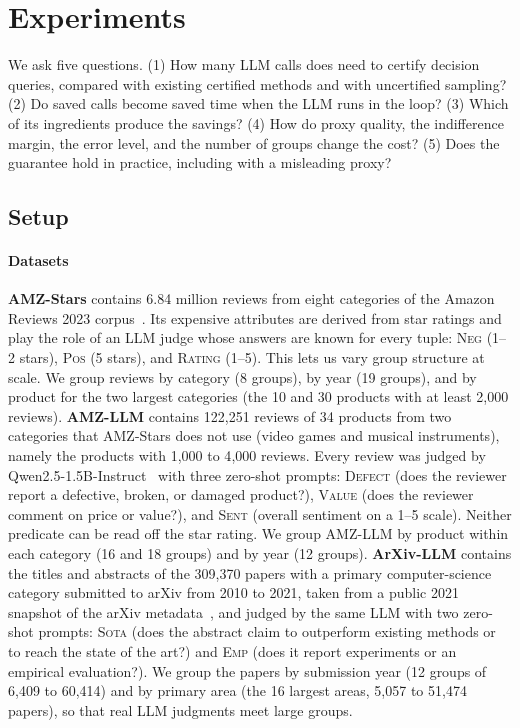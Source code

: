 \section{Experiments}
\label{sec:exp}

We ask five questions.
(1) How many LLM calls does \sys{} need to certify decision queries, compared with existing certified methods and with uncertified sampling?
(2) Do saved calls become saved time when the LLM runs in the loop?
(3) Which of its ingredients produce the savings?
(4) How do proxy quality, the indifference margin, the error level, and the number of groups change the cost?
(5) Does the guarantee hold in practice, including with a misleading proxy?

\subsection{Setup}
\label{sec:setup}

\paragraph*{Datasets}
\textbf{AMZ-Stars} contains 6.84 million reviews from eight categories of the Amazon Reviews 2023 corpus~\cite{amazon2023}.
Its expensive attributes are derived from star ratings and play the role of an LLM judge whose answers are known for every tuple: \textsc{Neg} (1--2 stars), \textsc{Pos} (5 stars), and \textsc{Rating} (1--5).
This lets us vary group structure at scale.
We group reviews by category (8 groups), by year (19 groups), and by product for the two largest categories (the 10 and 30 products with at least 2{,}000 reviews).
\textbf{AMZ-LLM} contains 122{,}251 reviews of 34 products from two categories that AMZ-Stars does not use (video games and musical instruments), namely the products with 1{,}000 to 4{,}000 reviews.
Every review was judged by Qwen2.5-1.5B-Instruct~\cite{qwen25} with three zero-shot prompts: \textsc{Defect} (does the reviewer report a defective, broken, or damaged product?), \textsc{Value} (does the reviewer comment on price or value?), and \textsc{Sent} (overall sentiment on a 1--5 scale).
Neither predicate can be read off the star rating.
We group AMZ-LLM by product within each category (16 and 18 groups) and by year (12 groups).
\textbf{ArXiv-LLM} contains the titles and abstracts of the 309{,}370 papers with a primary computer-science category submitted to arXiv from 2010 to 2021, taken from a public 2021 snapshot of the arXiv metadata~\cite{arxivdata}, and judged by the same LLM with two zero-shot prompts: \textsc{Sota} (does the abstract claim to outperform existing methods or to reach the state of the art?) and \textsc{Emp} (does it report experiments or an empirical evaluation?).
We group the papers by submission year (12 groups of 6{,}409 to 60{,}414) and by primary area (the 16 largest areas, 5{,}057 to 51{,}474 papers), so that real LLM judgments meet large groups.

